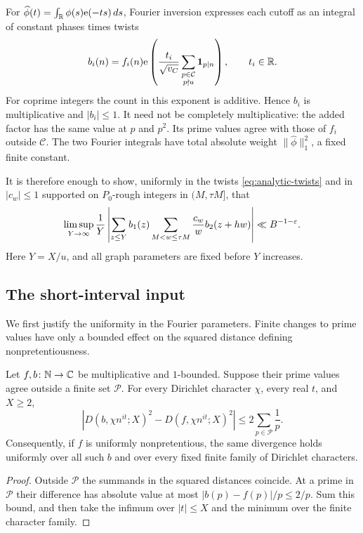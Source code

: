 For $\widehat\phi(t)=\int_{\mathbb R}\phi(s)\mathrm e(-ts)\,ds$,
Fourier inversion expresses each cutoff as an integral of constant
phases times twists
\begin{equation}\label{eq:analytic-twists}
 b_i(n)=f_i(n)\mathrm e\left(
 \frac{t_i}{\sqrt{v_C}}
 \sum_{\substack{p\in\mathcal C\\p\nmid u}}\mathbf 1_{p\mid n}\right),
 \qquad t_i\in\mathbb R.
\end{equation}
For coprime integers the count in this exponent is additive. Hence
$b_i$ is multiplicative and $|b_i|\le1$. It need not be completely
multiplicative: the added factor has the same value at $p$ and $p^2$.
Its prime values agree with those of $f_i$ outside $\mathcal C$.
The two Fourier integrals have total absolute weight
$\|\widehat\phi\|_1^2$, a fixed finite constant.

It is therefore enough to show, uniformly in the twists
\eqref{eq:analytic-twists} and in $|c_w|\le1$ supported on
$P_0$-rough integers in $(M,\tau M]$, that
\begin{equation}\label{eq:analytic-rough-target}
 \limsup_{Y\to\infty}\frac1Y
 \left|\sum_{z\le Y}b_1(z)
       \sum_{M<w\le\tau M}\frac{c_w}{w}b_2(z+hw)\right|
 \ll B^{-1-\varepsilon}.
\end{equation}
Here $Y=X/u$, and all graph parameters are fixed before $Y$ increases.

\subsection{The short-interval input}

We first justify the uniformity in the Fourier parameters. Finite
changes to prime values have only a bounded effect on the squared
distance defining nonpretentiousness.

\begin{lemma}
\label{lem:finite-prime-stability}
Let $f,b\colon\mathbb N\to\mathbb C$ be multiplicative and $1$-bounded. Suppose their
prime values agree outside a finite set $\mathcal P$. For every
Dirichlet character $\chi$, every real $t$, and $X\ge2$,
\begin{equation}\label{eq:analytic-distance-stability}
 \left|D(b,\chi n^{it};X)^2-D(f,\chi n^{it};X)^2\right|
 \le2\sum_{p\in\mathcal P}\frac1p.
\end{equation}
Consequently, if $f$ is uniformly nonpretentious, the same divergence
holds uniformly over all such $b$ and over every fixed finite family
of Dirichlet characters.
\end{lemma}
\begin{proof}
Outside $\mathcal P$ the summands in the squared distances coincide.
At a prime in $\mathcal P$ their difference has absolute value at most
$|b(p)-f(p)|/p\le2/p$. Sum this bound, and then take the infimum over
$|t|\le X$ and the minimum over the finite character family.
\end{proof}

